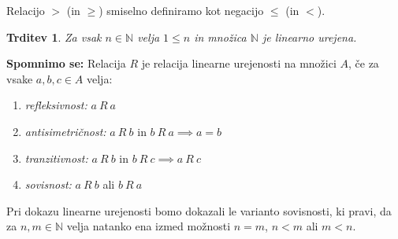 \documentclass[12pt, a4paper]{article}
\newtheorem{trd}{Trditev}
\newenvironment{spom}[1][]{\par\medskip\noindent \textbf{Spomnimo se: }}{\medskip}
\begin{document}
Relacijo $>$ (in $\geq$) smiselno definiramo kot negacijo $\leq$ (in $<$).

\begin{trd}
Za vsak $n\in \mathbb{N}$ velja $1\leq n$ in množica $\mathbb{N}$ je linearno urejena.
\end{trd}

\begin{spom}
Relacija $R$ je relacija linearne urejenosti na množici $A$, če za vsake $a,b,c \in A$ velja:
\begin{enumerate}
\item \textit{refleksivnost:} $a\ R\ a$
\item \textit{antisimetričnost:} $a\ R\ b$ in $b\ R\ a \implies a=b$
\item \textit{tranzitivnost:} $a\ R\ b$ in $b\ R\ c \implies a\  R\ c$
\item \textit{sovisnost:} $a\ R\ b$ ali $b\ R\ a$
\end{enumerate}
\end{spom}

Pri dokazu linearne urejenosti bomo dokazali le varianto sovisnosti, ki pravi, da za $n,m \in \mathbb{N}$ velja natanko ena izmed možnosti $n=m$, $n < m$ ali $m<n$.
\end{document}
